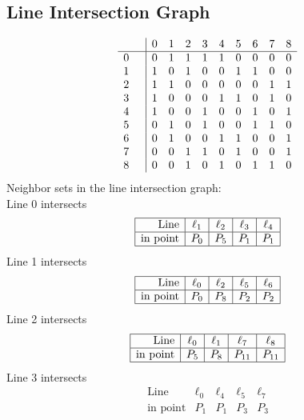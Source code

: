 \documentclass{article}
\begin{document}
{\subsection*{Line Intersection Graph}
{\arraycolsep=1pt
$$
\begin{array}{rr|*{9}r}
 &  & 0 & 1 & 2 & 3 & 4 & 5 & 6 & 7 & 8\\
\hline
0 &  & 0 & 1 & 1 & 1 & 1 & 0 & 0 & 0 & 0\\
1 &  & 1 & 0 & 1 & 0 & 0 & 1 & 1 & 0 & 0\\
2 &  & 1 & 1 & 0 & 0 & 0 & 0 & 0 & 1 & 1\\
3 &  & 1 & 0 & 0 & 0 & 1 & 1 & 0 & 1 & 0\\
4 &  & 1 & 0 & 0 & 1 & 0 & 0 & 1 & 0 & 1\\
5 &  & 0 & 1 & 0 & 1 & 0 & 0 & 1 & 1 & 0\\
6 &  & 0 & 1 & 0 & 0 & 1 & 1 & 0 & 0 & 1\\
7 &  & 0 & 0 & 1 & 1 & 0 & 1 & 0 & 0 & 1\\
8 &  & 0 & 0 & 1 & 0 & 1 & 0 & 1 & 1 & 0\\
\end{array}
$$
}%
Neighbor sets in the line intersection graph:\\
Line 0 intersects 
$$
\begin{array}{|r*{4}{|c}|}
\hline
\mbox{Line}  & \ell_{1} & \ell_{2} & \ell_{3} & \ell_{4}\\
\hline
\mbox{in point}  & P_{0} & P_{5} & P_{1} & P_{1}\\
\hline
\end{array}
$$
Line 1 intersects 
$$
\begin{array}{|r*{4}{|c}|}
\hline
\mbox{Line}  & \ell_{0} & \ell_{2} & \ell_{5} & \ell_{6}\\
\hline
\mbox{in point}  & P_{0} & P_{8} & P_{2} & P_{2}\\
\hline
\end{array}
$$
Line 2 intersects 
$$
\begin{array}{|r*{4}{|c}|}
\hline
\mbox{Line}  & \ell_{0} & \ell_{1} & \ell_{7} & \ell_{8}\\
\hline
\mbox{in point}  & P_{5} & P_{8} & P_{11} & P_{11}\\
\hline
\end{array}
$$
Line 3 intersects 
$$
\begin{array}{|r*{4}{|c}|}
\hline
\mbox{Line}  & \ell_{0} & \ell_{4} & \ell_{5} & \ell_{7}\\
\hline
\mbox{in point}  & P_{1} & P_{1} & P_{3} & P_{3}\\

\end{array}$$}
\end{document}
